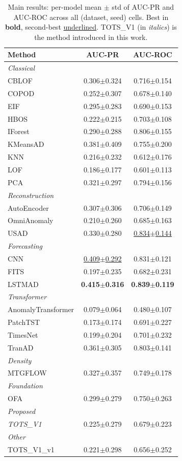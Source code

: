 \begin{table}[t]
\centering
\small
\caption{Main results: per-model mean $\pm$ std of AUC-PR and AUC-ROC across all (dataset, seed) cells. Best in \textbf{bold}, second-best \underline{underlined}. TOTS_V1 (in \textit{italics}) is the method introduced in this work.}
\label{tab:main-results}
\begin{tabular}{lcc}
\toprule
Method & AUC-PR & AUC-ROC \\
\midrule
\multicolumn{3}{l}{\textit{Classical}} \\
CBLOF & 0.306$\pm$0.324 & 0.716$\pm$0.154 \\
COPOD & 0.252$\pm$0.307 & 0.678$\pm$0.140 \\
EIF & 0.295$\pm$0.283 & 0.690$\pm$0.153 \\
HBOS & 0.222$\pm$0.215 & 0.703$\pm$0.108 \\
IForest & 0.290$\pm$0.288 & 0.806$\pm$0.155 \\
KMeansAD & 0.381$\pm$0.409 & 0.755$\pm$0.200 \\
KNN & 0.216$\pm$0.232 & 0.612$\pm$0.176 \\
LOF & 0.186$\pm$0.177 & 0.601$\pm$0.113 \\
PCA & 0.321$\pm$0.297 & 0.794$\pm$0.156 \\
\midrule
\multicolumn{3}{l}{\textit{Reconstruction}} \\
AutoEncoder & 0.307$\pm$0.306 & 0.706$\pm$0.149 \\
OmniAnomaly & 0.210$\pm$0.260 & 0.685$\pm$0.163 \\
USAD & 0.330$\pm$0.280 & \underline{0.834$\pm$0.144} \\
\midrule
\multicolumn{3}{l}{\textit{Forecasting}} \\
CNN & \underline{0.409$\pm$0.292} & 0.831$\pm$0.121 \\
FITS & 0.197$\pm$0.235 & 0.682$\pm$0.231 \\
LSTMAD & \textbf{0.415$\pm$0.316} & \textbf{0.839$\pm$0.119} \\
\midrule
\multicolumn{3}{l}{\textit{Transformer}} \\
AnomalyTransformer & 0.079$\pm$0.064 & 0.480$\pm$0.107 \\
PatchTST & 0.173$\pm$0.174 & 0.691$\pm$0.227 \\
TimesNet & 0.199$\pm$0.204 & 0.701$\pm$0.232 \\
TranAD & 0.361$\pm$0.305 & 0.803$\pm$0.141 \\
\midrule
\multicolumn{3}{l}{\textit{Density}} \\
MTGFLOW & 0.327$\pm$0.357 & 0.749$\pm$0.178 \\
\midrule
\multicolumn{3}{l}{\textit{Foundation}} \\
OFA & 0.299$\pm$0.279 & 0.750$\pm$0.263 \\
\midrule
\multicolumn{3}{l}{\textit{Proposed}} \\
\textit{TOTS\_V1} & 0.225$\pm$0.279 & 0.679$\pm$0.223 \\
\midrule
\multicolumn{3}{l}{\textit{Other}} \\
TOTS\_V1\_v1 & 0.221$\pm$0.298 & 0.656$\pm$0.252 \\
\bottomrule
\end{tabular}
\end{table}
